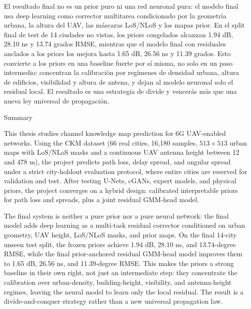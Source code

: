 El resultado final no es un prior puro ni una red neuronal pura: el modelo final
usa deep learning como corrector multitarea condicionado por la geometría urbana,
la altura del UAV, las máscaras LoS/NLoS y los mapas prior. En el split final de
test de 14 ciudades no vistas, los priors congelados alcanzan 1.94 dB,
28.10 ns y 13.74 grados RMSE, mientras que el modelo final con residuales
anclados a los priors los mejora hasta 1.65 dB, 26.56 ns y 11.39 grados. Esto
convierte a los priors en una baseline fuerte por sí misma, no solo en un paso
intermedio: concentran la calibración por regímenes de densidad urbana, altura
de edificios, visibilidad y altura de antena, y dejan al modelo neuronal solo el
residual local. El resultado es una estrategia de divide y vencerás más que una
nueva ley universal de propagación.

\begin{center}
  \huge\bfseries\raggedright\vspace*{.5\baselineskip} Summary~\hrulefill
\end{center}
This thesis studies channel knowledge map prediction for 6G UAV-enabled
networks. Using the CKM dataset (66 real cities, 16{,}180 samples, $513\times
513$ urban maps with LoS/NLoS masks and a continuous UAV antenna height
between 12 and 478 m), the project predicts path loss, delay spread, and
angular spread under a strict city-holdout evaluation protocol, where entire
cities are reserved for validation and test. After testing U-Nets, cGANs,
expert models, and physical priors, the project converges on a hybrid design:
calibrated interpretable priors for path loss and spreads, plus a joint
residual GMM-head model.

The final system is neither a pure prior nor a pure neural network: the final
model adds deep learning as a multi-task residual corrector conditioned on urban
geometry, UAV height, LoS/NLoS masks, and prior maps. On the final 14-city
unseen test split, the frozen priors achieve 1.94 dB, 28.10 ns, and 13.74-degree
RMSE, while the final prior-anchored residual GMM-head model improves them to
1.65 dB, 26.56 ns, and 11.39-degree RMSE. This makes the priors a strong
baseline in their own right, not just an intermediate step: they concentrate the
calibration over urban-density, building-height, visibility, and antenna-height
regimes, leaving the neural model to learn only the local residual. The result is
a divide-and-conquer strategy rather than a new universal propagation law.
